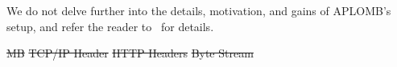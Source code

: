 \documentclass[letterpaper,twocolumn,10pt]{article}
\newcommand{\sys}{Embark\xspace} %
\providecommand{\DIFdeltex}[1]{{\protect\color{red}\sout{#1}}}                      %
\providecommand{\DIFdelbegin}{} %
\providecommand{\DIFdelFL}[1]{\DIFdel{#1}} %
\providecommand{\DIFdelbeginFL}{} %
\providecommand{\DIFdelendFL}{} %
\providecommand{\DIFdel}[1]{\texorpdfstring{\DIFdeltex{#1}}{}} %
\begin{document}
We do not delve further into the details, motivation, and gains of APLOMB's setup, and refer the reader to~\cite{aplomb} for details. 

\DIFdelbegin %
\DIFdelFL{\hspace{-2pt}
}%
\DIFdelFL{MB}%
\DIFdelFL{TCP/IP Header}%
\DIFdelFL{HTTP Headers}%
\DIFdelFL{Byte Stream}%
\DIFdelendFL %

\DIFdelbeginFL %
\end{document}
